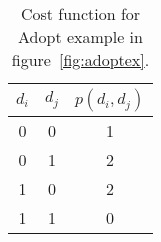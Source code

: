 \begin{SCtable}
  \begin{minipage}{1.0\linewidth}
  \begin{center}
    \begin{tabular}[c]{ccc} \toprule
      $d_i$ & $d_j$ & $p(d_i,d_j)$ \\ \midrule
      0 & 0 & 1 \\
      0 & 1 & 2 \\
      1 & 0 & 2 \\
      1 & 1 & 0 \\ \bottomrule
    \end{tabular}
  \end{center}
  \end{minipage}
  \caption{Cost function for Adopt example in figure~\ref{fig:adoptex}.}
  \label{tab:adoptcost}
\end{SCtable}


